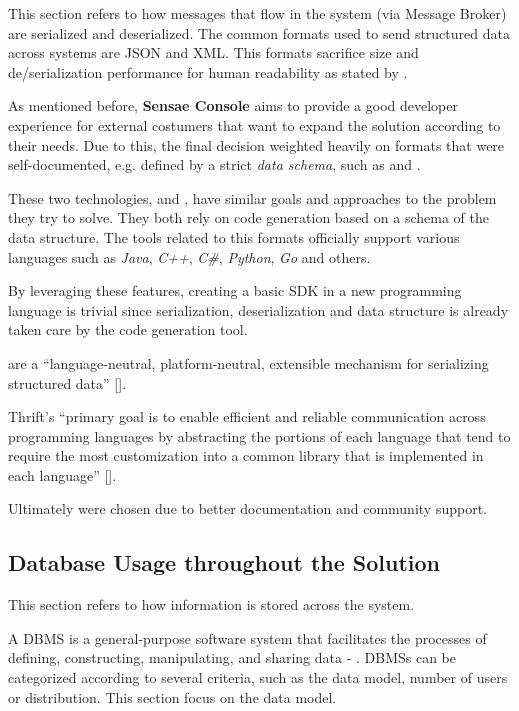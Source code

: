 This section refers to how messages that flow in the system (via Message Broker) are serialized and deserialized. The common formats used to send structured data across systems are \gls{JSON} and \gls{XML}. This formats sacrifice size and de/serialization performance for human readability as stated by \cite{sumaray2012comparison}.

As mentioned before, \textbf{Sensae Console} aims to provide a good developer experience for external costumers that want to expand the solution according to their needs. Due to this, the final decision weighted heavily on formats that were self-documented, e.g. defined by a strict \textit{data schema}, such as  and .

These two technologies,  and , have similar goals and approaches to the problem they try to solve. They both rely on code generation based on a schema of the data structure. The tools related to this formats officially support various languages such as \textit{Java}, \textit{C++}, \textit{C\#}, \textit{Python}, \textit{Go} and others.

By leveraging these features, creating a basic \gls{SDK} in a new programming language is trivial since serialization, deserialization and data structure is already taken care by the code generation tool.

 are a ``language-neutral, platform-neutral, extensible mechanism for serializing structured data'' [\cite{proto}].

Thrift's ``primary goal is to enable efficient and reliable communication across programming languages by abstracting the portions of each language that tend to require the most customization into a common library that is implemented in each language'' [\cite{thrift}].

Ultimately  were chosen due to better documentation and community support.


\subsection{Database Usage throughout the Solution}
\label{subsec:implementation:decisions:database}

This section refers to how information is stored across the system.

A \gls{DBMS} is a general-purpose software system that facilitates the processes of defining, constructing, manipulating, and sharing data - . \gls{DBMS}s can be categorized according to several criteria, such as the data model, number of users or distribution. This section focus on the data model.

